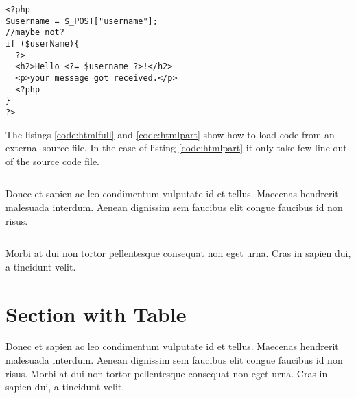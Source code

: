 \begin{code}
  \begin{verbatim}
<?php
$username = $_POST["username"];
//maybe not?
if ($userName){
  ?>
  <h2>Hello <?= $username ?>!</h2>
  <p>your message got received.</p>
  <?php
}
?>
\end{verbatim}
  \label{code:testphp}
\end{code}


The lisings \ref{code:htmlfull} and \ref{code:htmlpart} show how to load code from an external source file. In the case of listing \ref{code:htmlpart} it only take few line out of the source code file.

\begin{code}
  \inputminted{html}{code/html5_sample.html}
  \label{code:htmlfull}
\end{code}
 Donec et sapien ac leo condimentum vulputate id et tellus. Maecenas hendrerit malesuada interdum. Aenean dignissim sem faucibus elit congue faucibus id non risus.

 \begin{code}
   \inputminted[firstline=3,lastline=6]{html}{code/html5_sample.html}
  \label{code:htmlpart}
\end{code}


 Morbi at dui non tortor pellentesque consequat non eget urna. Cras in sapien dui, a tincidunt velit.


\section{Section with Table}
Donec et sapien ac leo condimentum vulputate id et tellus. Maecenas hendrerit malesuada interdum. Aenean dignissim sem faucibus elit congue faucibus id non risus. Morbi at dui non tortor pellentesque consequat non eget urna. Cras in sapien dui, a tincidunt velit.

